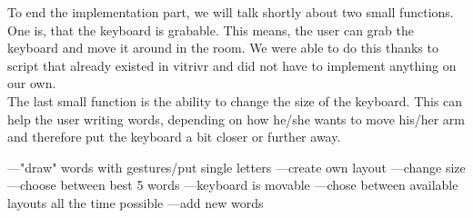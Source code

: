 To end the implementation part, we will talk shortly about two small functions. One is, that the keyboard is grabable. This means, the user can grab the keyboard and move it around in the room. We were able to do this thanks to script that already existed in vitrivr and did not have to implement anything on our own.\\
The last small function is the ability to change the size of the keyboard. This can help the user writing words, depending on how he/she wants to move his/her arm and therefore put the keyboard a bit closer or further away.



---"draw" words with gestures/put single letters
---create own layout
---change size
---choose between best 5 words
---keyboard is movable
---chose between available layouts all the time possible
---add new words
